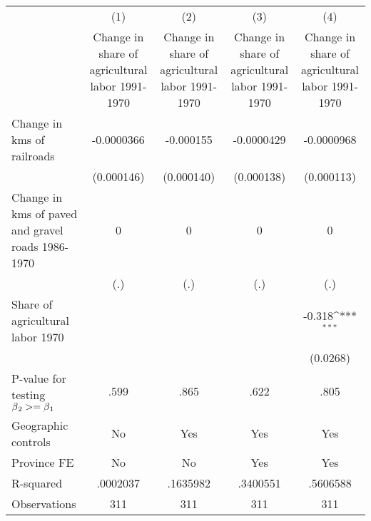 {
\def\sym#1{\ifmmode^{#1}\else\(^{#1}\)\fi}
\begin{tabular}{l*{4}{c}}
\hline\hline
                &\multicolumn{1}{c}{(1)}&\multicolumn{1}{c}{(2)}&\multicolumn{1}{c}{(3)}&\multicolumn{1}{c}{(4)}\\
                &\multicolumn{1}{c}{Change in share of agricultural labor 1991-1970}&\multicolumn{1}{c}{Change in share of agricultural labor 1991-1970}&\multicolumn{1}{c}{Change in share of agricultural labor 1991-1970}&\multicolumn{1}{c}{Change in share of agricultural labor 1991-1970}\\
\hline
Change in kms of railroads&-0.0000366         &-0.000155         &-0.0000429         &-0.0000968         \\
                &(0.000146)         &(0.000140)         &(0.000138)         &(0.000113)         \\
[1em]
Change in kms of paved and gravel roads 1986-1970&        0         &        0         &        0         &        0         \\
                &      (.)         &      (.)         &      (.)         &      (.)         \\
[1em]
Share of agricultural labor 1970&                  &                  &                  &   -0.318\sym{***}\\
                &                  &                  &                  & (0.0268)         \\
\hline
P-value for testing $\beta\\_2 >= \beta\\_1$&     .599         &     .865         &     .622         &     .805         \\
Geographic controls&       No         &      Yes         &      Yes         &      Yes         \\
Province FE     &       No         &       No         &      Yes         &      Yes         \\
R-squared       & .0002037         & .1635982         & .3400551         & .5606588         \\
Observations    &      311         &      311         &      311         &      311         \\
\hline\hline
\end{tabular}
}
